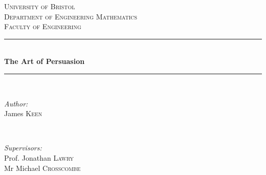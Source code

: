 \begin{titlepage}

\newcommand{\HRule}{\rule{\linewidth}{0.5mm}} %

\center %
 

\textsc{\LARGE University of Bristol}\\[1.5cm] %
\textsc{\Large Department of Engineering Mathematics}\\[0.5cm] %
\textsc{\large Faculty of Engineering}\\[0.5cm] %


\HRule \\[0.7cm]
{ \huge \bfseries The Art of Persuasion}\\[0.4cm] %
\HRule \\[1.5cm]
 

\begin{minipage}{0.4\textwidth}
\begin{flushleft} \large
\emph{Author:}\\
James \textsc{Keen} %
\end{flushleft}
\end{minipage}
~
\begin{minipage}{0.4\textwidth}
\begin{flushright} \large
\emph{Supervisors:} \\
Prof. Jonathan \textsc{Lawry}\\
Mr Michael \textsc{Crosscombe} %
\end{flushright}
\end{minipage}\\[3cm]


\end{titlepage}

